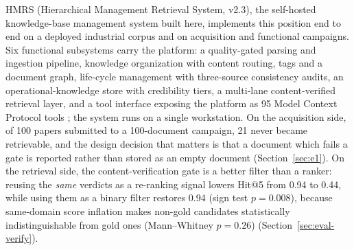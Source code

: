 HMRS (Hierarchical Management Retrieval System, v2.3), the self-hosted
knowledge-base management system built here,
implements this position end to end on a deployed industrial corpus and on
acquisition and functional campaigns. Six functional subsystems carry the
platform: a quality-gated parsing and ingestion pipeline, knowledge
organization with content routing, tags and a document graph, life-cycle
management with three-source consistency audits, an operational-knowledge store
with credibility tiers, a multi-lane content-verified retrieval layer, and a
tool interface exposing the platform as 95 Model Context Protocol tools
\cite{mcp}; the system runs on a single workstation. On the acquisition side,
of 100 papers submitted to a 100-document campaign, 21 never became
retrievable, and the
design decision that matters is that a document which fails a gate is
reported rather than
stored as an empty document (Section~\ref{sec:e1}). On the retrieval side, the
content-verification gate is a better filter than a ranker: reusing the
\emph{same} verdicts as a re-ranking signal lowers Hit@5 from 0.94 to 0.44,
while using them as a binary filter restores 0.94 (sign test $p = 0.008$),
because same-domain score inflation makes non-gold candidates statistically
indistinguishable from gold ones (Mann--Whitney $p = 0.26$)
(Section~\ref{sec:eval-verify}).

